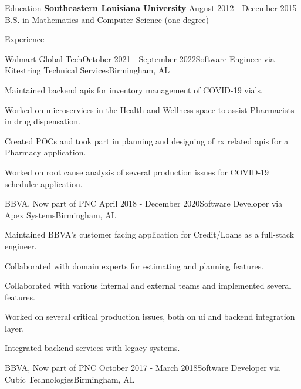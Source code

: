 \documentclass[11pt,]{resume}
\begin{document}
	\begin{rSection}{Education}
		\textbf{Southeastern Louisiana University} \hfill{August 2012 - December 2015} \\ B.S. in Mathematics and Computer Science (one degree)
	\end{rSection}

	\begin{rSection}{Experience}
		\begin{rSubsection}{Walmart Global Tech}{October 2021 - September 2022}{Software Engineer via Kitestring Technical Services}{Birmingham, AL}
			\item Maintained backend apis for inventory management of COVID-19 vials.
			\item Worked on microservices in the Health and Wellness space to assist Pharmacists in drug dispensation.
			\item Created POCs and took part in planning and designing of rx related apis for a Pharmacy application.
			\item Worked on root cause analysis of several production issues for COVID-19 scheduler application.
		\end{rSubsection}

		\begin{rSubsection}{BBVA, Now part of PNC }{April 2018 - December 2020}{Software Developer via Apex Systems}{Birmingham, AL}
			\item Maintained BBVA's customer facing application for Credit/Loans as a full-stack engineer.
			\item Collaborated with domain experts for estimating and planning features.
			\item Collaborated with various internal and external teams and implemented several features.
			\item Worked on several critical production issues, both on ui and backend integration layer.
			\item Integrated backend services with legacy systems.
		\end{rSubsection}

		\begin{rSubsection}{BBVA, Now part of PNC }{October 2017 - March 2018}{Software Developer via Cubic Technologies}{Birmingham, AL}
			\item[]\vspace{-1.5\baselineskip}
		\end{rSubsection}
	\end{rSection}
\end{document}
